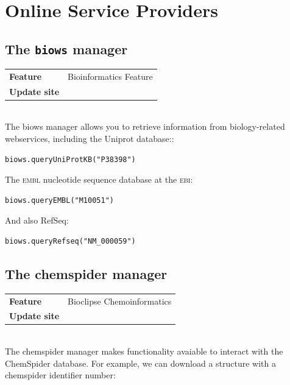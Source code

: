 \documentclass{book}
\begin{document}
\chapter{Online Service Providers}
\begin{refsection}

\section{The \texttt{biows} manager}

\begin{tabular}{ll}
\textbf{Feature} & Bioinformatics Feature \\
\textbf{Update site} & \url{} \\
\end{tabular} \\

The biows manager allows you to retrieve information from biology-related
webservices, including the Uniprot database::

\begin{Verbatim}
biows.queryUniProtKB("P38398")
\end{Verbatim}

The \textsc{embl} nucleotide sequence database at the \textsc{ebi}:

\begin{Verbatim}
biows.queryEMBL("M10051")
\end{Verbatim}

And also RefSeq:

\begin{Verbatim}
biows.queryRefseq("NM_000059")
\end{Verbatim}

\section{The chemspider manager}

\begin{tabular}{ll}
\textbf{Feature} & Bioclipse Chemoinformatics \\
\textbf{Update site} & \url{} \\
\end{tabular} \\

The chemspider manager makes functionality avaiable to interact
with the ChemSpider database. For example, we
can download a structure with a chemspider identifier
number:


\end{refsection}
\end{document}
